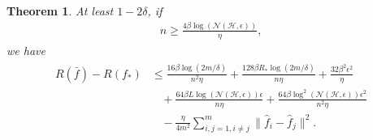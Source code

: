 \documentclass{article}
\newtheorem{theorem}{Theorem}
\begin{document}
\begin{theorem}
  At least $1-2\delta$,
  if
  \begin{align}
    \label{equation-12}
    n\geq \frac{4\beta\log\left(\mathcal{N}(\mathcal{H},\epsilon)\right)}{\eta},
  \end{align}
  we have
  \begin{align}
    \label{equation-13}
    \begin{aligned}
    R(\bar{f})-R(f_\ast)&\leq
    \frac{16\beta \log(2m/\delta)}{n^2\eta}+\frac{128\beta R_\ast\log(2m/\delta)}{n\eta}+\frac{32\beta^2\epsilon^2}{\eta}\\
   &~~~~+
   \frac{64\beta L \log\left(\mathcal{N}(\mathcal{H},\epsilon)\right)\epsilon}{n\eta}+
   \frac{64\beta \log^2\left(\mathcal{N}(\mathcal{H},\epsilon)\right)\epsilon^2}{n^2\eta}\\
  &~~~~-\frac{\eta}{4m^2}\sum_{i,j=1,i\not=j}^m\|\hat{f}_i-\hat{f}_j\|^2.
  \end{aligned}
  \end{align}
\end{theorem}
\end{document}
